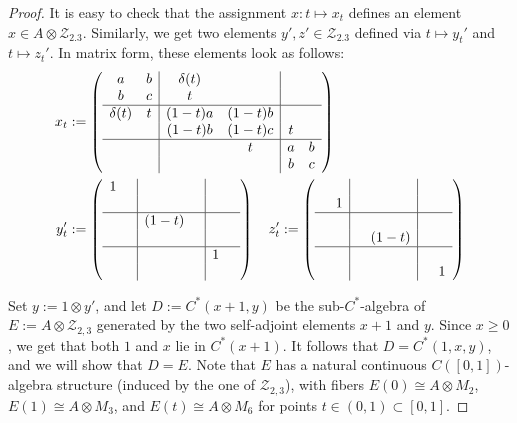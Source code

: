 \documentclass{amsart}
\theoremstyle{definition}
\begin{document}
\begin{proof}
    It is easy to check that the assignment $x\colon t\mapsto x_t$ defines an element $x\in A\otimes \mathcal{Z}_{2.3}$.
    Similarly, we get two elements $y',z'\in\mathcal{Z}_{2.3}$ defined via $t\mapsto y_t'$ and $t\mapsto z_t'$.
    In matrix form, these elements look as follows:
    \begin{align*}
        x_t &:=\left( \begin{array}{cc|cc|cc}
            a & b & \delta(t) & & \\
            b & c & t & & \\
            \hline 
            \delta(t) & t & (1-t)a & (1-t)b & \\
            & & (1-t)b & (1-t)c & t \\
            \hline 
            & & & t & a & b \\
            & & & & b & c\\
        \end{array} \right) \\
        y_t' &:=\left( \begin{array}{cc|cc|cc}
            1 & & & \\
            & & & & \\
            \hline 
            & & (1-t) & \\
            & & & & \\
            \hline 
            & & & & 1 \\
            & & & & & \\
        \end{array} \right)
        \quad
        z_t' :=\left( \begin{array}{cc|cc|cc}
            & & & \\
            & 1 & & & \\
            \hline 
            & & & \\
            & & & (1-t) & \\
            \hline 
            & & & & & \\
            & & & & & 1 \\
        \end{array} \right)
    \end{align*}

    Set $y:=1\otimes y'$, and let $D:=C^{*}(x+1,y)$ be the sub-{{$C^*$-al\-ge\-bra}}{} of $E:=A\otimes \mathcal{Z}_{2,3}$ generated by the two self-adjoint elements $x+1$ and $y$.
    Since $x\geq 0$, we get that both $1$ and $x$ lie in $C^{*}(x+1)$.
    It follows that $D=C^{*}(1,x,y)$, and we will show that $D=E$.
    Note that $E$ has a natural continuous $C([0,1])$-algebra structure (induced by the one of $\mathcal{Z}_{2,3}$), with fibers $E(0)\cong A\otimes M_2$, $E(1)\cong A\otimes M_3$, and $E(t)\cong A\otimes M_6$ for points $t\in (0,1)\subset[0,1]$.


\end{proof}
\end{document}
